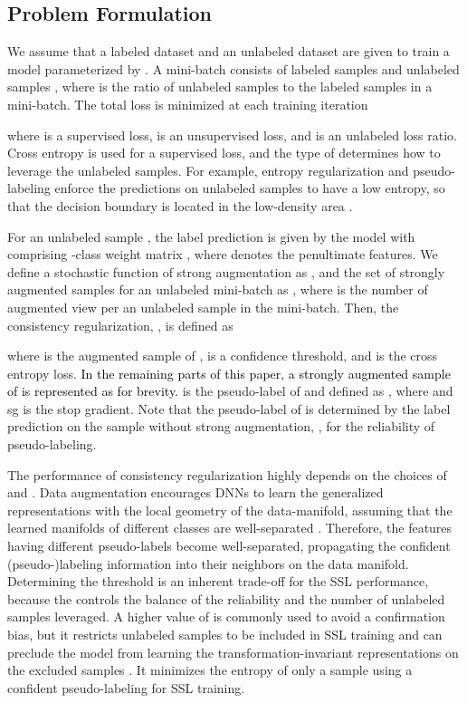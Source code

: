 \documentclass[letterpaper]{article} \usepackage{aaai22}  \usepackage{times}  \usepackage{helvet}  \usepackage{courier}  \usepackage[hyphens]{url}  \usepackage{graphicx} \urlstyle{rm} \def\UrlFont{\rm}  \usepackage{natbib}  \usepackage{caption} \DeclareCaptionStyle{ruled}{labelfont=normalfont,labelsep=colon,strut=off} \frenchspacing  \setlength{\pdfpagewidth}{8.5in}  \setlength{\pdfpageheight}{11in}  \usepackage{algorithm}
\begin{document}
\subsection{Problem Formulation}
We assume that a labeled dataset  and an unlabeled dataset  are given to train a model parameterized by .
A mini-batch  consists of  labeled samples  and  unlabeled samples , where  is the ratio of unlabeled samples to the labeled samples in a mini-batch.
The total loss  is minimized at each training iteration

where  is a supervised loss,  is an unsupervised loss, and  is an unlabeled loss ratio.
Cross entropy is used for a supervised loss, and the type of  determines how to leverage the unlabeled samples.
For example, entropy regularization \cite{grandvalet2005semi} and pseudo-labeling enforce the predictions on unlabeled samples to have a low entropy, so that the decision boundary is located in the low-density area \cite{sajjadi2016regularization}.

For an unlabeled sample , the label prediction  is given by the model with  comprising -class weight matrix , where  denotes the penultimate features.
We define a stochastic function of strong augmentation as , and the set of strongly augmented samples for an unlabeled mini-batch as , where  is the number of augmented view per an unlabeled sample in the mini-batch.
Then, the consistency regularization, , is defined as 

where  is the augmented sample of ,  is a confidence threshold, and  is the cross entropy loss.
\textcolor{black}{In the remaining parts of this paper, a strongly augmented sample of  is represented as  for brevity.}
 is the pseudo-label of  and defined as , where  and sg is the stop gradient.
Note that the pseudo-label of  is determined by the label prediction on the sample without strong augmentation, , for the reliability of pseudo-labeling.

The performance of consistency regularization highly depends on the choices of  and .
Data augmentation encourages DNNs to learn the generalized representations with the local geometry of the data-manifold, assuming that the learned manifolds of different classes are well-separated \cite{verma2019interpolation,ghosh2021data}. 
Therefore, the features having different pseudo-labels become well-separated, propagating the confident (pseudo-)labeling information into their neighbors on the data manifold.
Determining the threshold  is an inherent trade-off for the SSL performance, because the  controls the balance of the reliability and the number of unlabeled samples leveraged.
A higher value of  is commonly used to avoid a confirmation bias, but it restricts unlabeled samples to be included in SSL training and can preclude the model from learning the transformation-invariant representations on the excluded samples \cite{arazo2020pseudo}.
It minimizes the entropy of only a sample using a confident pseudo-labeling for SSL training.
\vspace{-0.15in}
\end{document}
